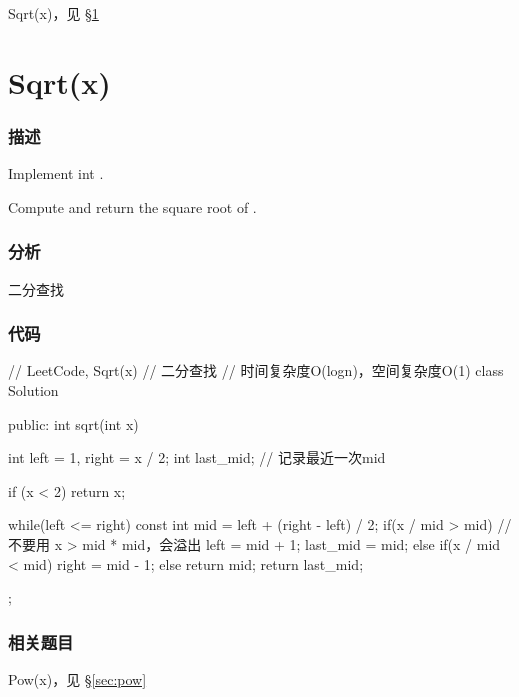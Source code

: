 \begindot
\item Sqrt(x)，见 \S \ref{sec:sqrt}
\myenddot


\section{Sqrt(x)} %
\label{sec:sqrt}

\subsubsection{描述}
Implement int .

Compute and return the square root of .


\subsubsection{分析}
二分查找


\subsubsection{代码}
\begin{Code}
	// LeetCode, Sqrt(x)
	// 二分查找
	// 时间复杂度O(logn)，空间复杂度O(1)
	class Solution {
		public:
		int sqrt(int x) {
			int left = 1, right = x / 2;
			int last_mid;  // 记录最近一次mid
			
			if (x < 2) return x;
			
			while(left <= right) {
				const int mid = left + (right - left) / 2;
				if(x / mid > mid) { // 不要用 x > mid * mid，会溢出
					left = mid + 1;
					last_mid = mid;
				} else if(x / mid < mid) {
				right = mid - 1;
			} else {
			return mid;
		}
	}
	return last_mid;
}
};
\end{Code}


\subsubsection{相关题目}
\begindot
\item Pow(x)，见 \S \ref{sec:pow}
\myenddot
